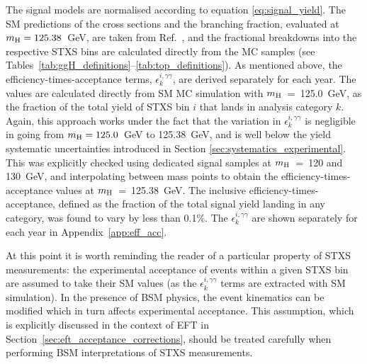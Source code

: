The signal models are normalised according to equation \ref{eq:signal_yield}. The SM predictions of the cross sections and the \Hgg branching fraction, evaluated at $m_{\rm{H}}=125.38$~GeV, are taken from Ref.~\cite{deFlorian:2016spz}, and the fractional breakdowns into the respective STXS bins are calculated directly from the MC samples (see Tables~\ref{tab:ggH_definitions}--\ref{tab:top_definitions}). As mentioned above, the efficiency-times-acceptance terms, $\epsilon^{i,\gamma\gamma}_{k}$, are derived separately for each year. The values are calculated directly from SM MC simulation with $m_{\rm{H}}$~=~125.0~GeV, as the fraction of the total yield of STXS bin $i$ that lands in analysis category $k$. Again, this approach works under the fact that the variation in $\epsilon^{i,\gamma\gamma}_{k}$ is negligible in going from $m_{\rm{H}}=125.0$~GeV to 125.38~GeV, and is well below the yield systematic uncertainties introduced in Section \ref{sec:systematics_experimental}. This was explicitly checked using dedicated signal samples at $m_{\rm{H}}$~=~120 and 130~GeV, and interpolating between mass points to obtain the efficiency-times-acceptance values at $m_{\rm{H}}$~=~125.38~GeV. The inclusive efficiency-times-acceptance, defined as the fraction of the total signal yield landing in any category, was found to vary by less than 0.1\%. The $\epsilon^{i,\gamma\gamma}_{k}$ are shown separately for each year in Appendix~\ref{app:eff_acc}.

At this point it is worth reminding the reader of a particular property of STXS measurements: the experimental acceptance of events within a given STXS bin are assumed to take their SM values (as the $\epsilon^{i,\gamma\gamma}_{k}$ terms are extracted with SM simulation). In the presence of BSM physics, the event kinematics can be modified which in turn affects experimental acceptance. This assumption, which is explicitly discussed in the context of EFT in Section~\ref{sec:eft_acceptance_corrections}, should be treated carefully when performing BSM interpretations of STXS measurements. 

